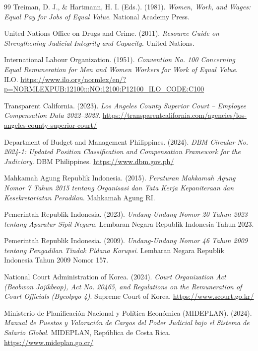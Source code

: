 \documentclass[12pt, a4paper]{article}
\begin{document}
\begin{thebibliography}{99}
Treiman, D. J., \& Hartmann, H. I. (Eds.). (1981). \textit{Women, Work, and Wages: Equal Pay for Jobs of Equal Value}. National Academy Press.

United Nations Office on Drugs and Crime. (2011). \textit{Resource Guide on Strengthening Judicial Integrity and Capacity}. United Nations.

International Labour Organization. (1951). \textit{Convention No. 100 Concerning Equal Remuneration for Men and Women Workers for Work of Equal Value}. ILO. \url{https://www.ilo.org/normlex/en/?p=NORMLEXPUB:12100:::NO:12100:P12100_ILO_CODE:C100}

Transparent California. (2023). \textit{Los Angeles County Superior Court -- Employee Compensation Data 2022--2023}. \url{https://transparentcalifornia.com/agencies/los-angeles-county-superior-court/}

Department of Budget and Management Philippines. (2024). \textit{DBM Circular No. 2024-1: Updated Position Classification and Compensation Framework for the Judiciary}. DBM Philippines. \url{https://www.dbm.gov.ph/}

Mahkamah Agung Republik Indonesia. (2015). \textit{Peraturan Mahkamah Agung Nomor 7 Tahun 2015 tentang Organisasi dan Tata Kerja Kepaniteraan dan Kesekretariatan Peradilan}. Mahkamah Agung RI.

Pemerintah Republik Indonesia. (2023). \textit{Undang-Undang Nomor 20 Tahun 2023 tentang Aparatur Sipil Negara}. Lembaran Negara Republik Indonesia Tahun 2023.

Pemerintah Republik Indonesia. (2009). \textit{Undang-Undang Nomor 46 Tahun 2009 tentang Pengadilan Tindak Pidana Korupsi}. Lembaran Negara Republik Indonesia Tahun 2009 Nomor 157.

National Court Administration of Korea. (2024). \textit{Court Organization Act (Beobwon Jojikbeop), Act No. 20465, and Regulations on the Remuneration of Court Officials (Byeolpyo 4)}. Supreme Court of Korea. \url{https://www.scourt.go.kr/}

Ministerio de Planificación Nacional y Política Económica (MIDEPLAN). (2024). \textit{Manual de Puestos y Valoración de Cargos del Poder Judicial bajo el Sistema de Salario Global}. MIDEPLAN, República de Costa Rica. \url{https://www.mideplan.go.cr/}

\end{thebibliography}
\end{document}
